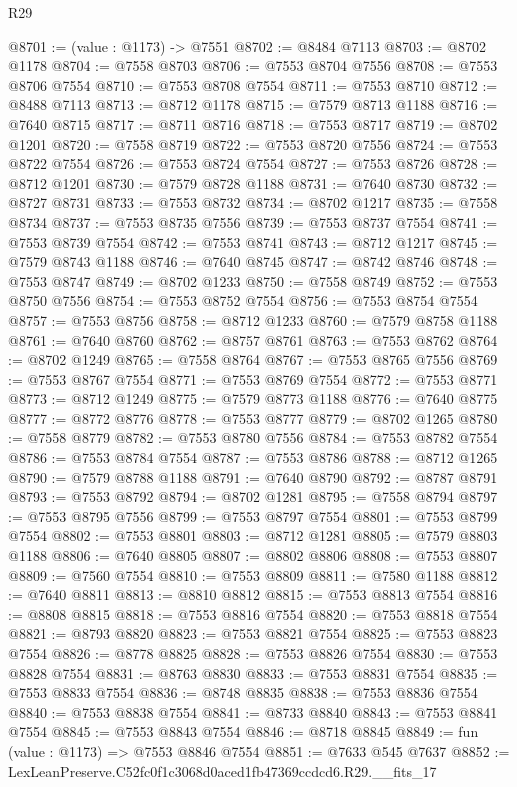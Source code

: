 \begin{lexlean}{R29}
\begin{coremodule}
@8701 := (value : @1173) -> @7551
@8702 := @8484 @7113
@8703 := @8702 @1178
@8704 := @7558 @8703
@8706 := @7553 @8704 @7556
@8708 := @7553 @8706 @7554
@8710 := @7553 @8708 @7554
@8711 := @7553 @8710
@8712 := @8488 @7113
@8713 := @8712 @1178
@8715 := @7579 @8713 @1188
@8716 := @7640 @8715
@8717 := @8711 @8716
@8718 := @7553 @8717
@8719 := @8702 @1201
@8720 := @7558 @8719
@8722 := @7553 @8720 @7556
@8724 := @7553 @8722 @7554
@8726 := @7553 @8724 @7554
@8727 := @7553 @8726
@8728 := @8712 @1201
@8730 := @7579 @8728 @1188
@8731 := @7640 @8730
@8732 := @8727 @8731
@8733 := @7553 @8732
@8734 := @8702 @1217
@8735 := @7558 @8734
@8737 := @7553 @8735 @7556
@8739 := @7553 @8737 @7554
@8741 := @7553 @8739 @7554
@8742 := @7553 @8741
@8743 := @8712 @1217
@8745 := @7579 @8743 @1188
@8746 := @7640 @8745
@8747 := @8742 @8746
@8748 := @7553 @8747
@8749 := @8702 @1233
@8750 := @7558 @8749
@8752 := @7553 @8750 @7556
@8754 := @7553 @8752 @7554
@8756 := @7553 @8754 @7554
@8757 := @7553 @8756
@8758 := @8712 @1233
@8760 := @7579 @8758 @1188
@8761 := @7640 @8760
@8762 := @8757 @8761
@8763 := @7553 @8762
@8764 := @8702 @1249
@8765 := @7558 @8764
@8767 := @7553 @8765 @7556
@8769 := @7553 @8767 @7554
@8771 := @7553 @8769 @7554
@8772 := @7553 @8771
@8773 := @8712 @1249
@8775 := @7579 @8773 @1188
@8776 := @7640 @8775
@8777 := @8772 @8776
@8778 := @7553 @8777
@8779 := @8702 @1265
@8780 := @7558 @8779
@8782 := @7553 @8780 @7556
@8784 := @7553 @8782 @7554
@8786 := @7553 @8784 @7554
@8787 := @7553 @8786
@8788 := @8712 @1265
@8790 := @7579 @8788 @1188
@8791 := @7640 @8790
@8792 := @8787 @8791
@8793 := @7553 @8792
@8794 := @8702 @1281
@8795 := @7558 @8794
@8797 := @7553 @8795 @7556
@8799 := @7553 @8797 @7554
@8801 := @7553 @8799 @7554
@8802 := @7553 @8801
@8803 := @8712 @1281
@8805 := @7579 @8803 @1188
@8806 := @7640 @8805
@8807 := @8802 @8806
@8808 := @7553 @8807
@8809 := @7560 @7554
@8810 := @7553 @8809
@8811 := @7580 @1188
@8812 := @7640 @8811
@8813 := @8810 @8812
@8815 := @7553 @8813 @7554
@8816 := @8808 @8815
@8818 := @7553 @8816 @7554
@8820 := @7553 @8818 @7554
@8821 := @8793 @8820
@8823 := @7553 @8821 @7554
@8825 := @7553 @8823 @7554
@8826 := @8778 @8825
@8828 := @7553 @8826 @7554
@8830 := @7553 @8828 @7554
@8831 := @8763 @8830
@8833 := @7553 @8831 @7554
@8835 := @7553 @8833 @7554
@8836 := @8748 @8835
@8838 := @7553 @8836 @7554
@8840 := @7553 @8838 @7554
@8841 := @8733 @8840
@8843 := @7553 @8841 @7554
@8845 := @7553 @8843 @7554
@8846 := @8718 @8845
@8849 := fun (value : @1173) => @7553 @8846 @7554
@8851 := @7633 @545 @7637
@8852 := LexLeanPreserve.C52fc0f1c3068d0aced1fb47369ccdcd6.R29.__fits_17

\end{coremodule}
\end{lexlean}
